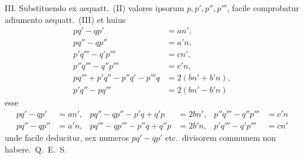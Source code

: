 \documentclass[12pt,a4paper]{article}
\theoremstyle{plain}
\theoremstyle{definition}
\theoremstyle{remark}
\begin{document}
III. Substituendo ex aequatt.\ (II) valores ipsorum $p, p', p'', p'''$, facile comprobatur adiumento aequatt.\ (III) et huius
\begin{align*}
pq' - qp' &= an', \\
pq'' - qp'' &= a'n, \\
p'q''' - q'p''' &= cn', \\
p''q''' - q''p''' &= c'n, \\
pq''' + p'q'' - p''q' - p'''q &= 2(bn' + b'n), \\
p'q'' - pq''' &= 2(bn' - b'n)
\end{align*}
esse
\begin{align*}
pq' - qp' &= an', &
pq'' - qp'' - p'q + q'p &= 2bn', &
p''q''' - q''p''' &= c'n \\
pq'' - qp'' &= a'n, &
pq''' - qp''' - p''q + q''p &= 2b'n, &
p'q''' - q'p''' &= cn'
\end{align*}
unde facile deducitur, sex numeros $pq' - qp'$ etc.\ divisorem communem non habere.\ Q.\ E.\ S.

\newpage
\end{document}
